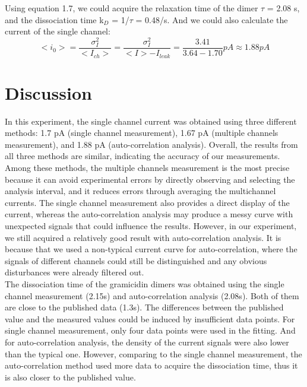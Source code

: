 \documentclass[a4paper,english,12pt,bibliography=totoc]{scrreprt}
\begin{document}
Using equation 1.7, we could acquire the relaxation time of the dimer $\tau$ = 2.08 s, and the dissociation time k$_D$ = 1/$\tau$ = 0.48/s. And we could also calculate the current of the single channel:
\[
<i_0> = \frac{\sigma^2_I}{<I_{ch}>} = \frac{\sigma^2_I}{<I> - I_{leak}} = \frac{3.41}{3.64-1.70}pA \approx 1.88pA
\]

\chapter{Discussion}
\label{cha:Discussion}
In this experiment, the single channel current was obtained using three different methods: 1.7 pA (single channel measurement), 1.67 pA (multiple channels measurement), and 1.88 pA (auto-correlation analysis). Overall, the results from all three methods are similar, indicating the accuracy of our measurements. Among these methods, the multiple channels measurement is the most precise because it can avoid experimental errors by directly observing and selecting the analysis interval, and it reduces errors through averaging the multichannel currents. The single channel measurement also provides a direct display of the current, whereas the auto-correlation analysis may produce a messy curve with unexpected signals that could influence the results. However, in our experiment, we still acquired a relatively good result with auto-correlation analysis. It is because that we used a non-typical current curve for auto-correlation, where the signals of different channels could still be distinguished and any obvious disturbances were already filtered out.\\

The dissociation time of the gramicidin dimers was obtained using the single channel measurement (2.15s) and auto-correlation analysis (2.08s). Both of them are close to the published data (1.3s). The differences between the published value and the measured values could be induced by insufficient data points. For single channel measurement, only four data points were used in the fitting. And for auto-correlation analysis, the density of the current signals were also lower than the typical one. However, comparing to the single channel measurement, the auto-correlation method used more data to acquire the dissociation time, thus it is also closer to the published value.

\end{document}
